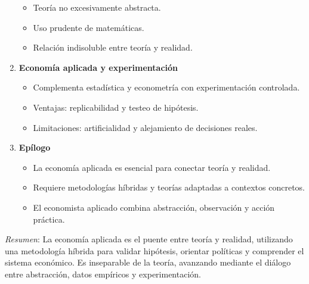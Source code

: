 \documentclass[12pt]{book} %
\providecommand{\tightlist}{%
  \setlength{\itemsep}{0pt}\setlength{\parskip}{0pt}}
\begin{document}
\begin{enumerate}
  \begin{itemize}
  \tightlist
  \item
    Teoría no excesivamente abstracta.
  \item
    Uso prudente de matemáticas.
  \item
    Relación indisoluble entre teoría y realidad.
  \end{itemize}
\item
  \textbf{Economía aplicada y experimentación}

  \begin{itemize}
  \tightlist
  \item
    Complementa estadística y econometría con experimentación
    controlada.
  \item
    Ventajas: replicabilidad y testeo de hipótesis.
  \item
    Limitaciones: artificialidad y alejamiento de decisiones reales.
  \end{itemize}
\item
  \textbf{Epílogo}

  \begin{itemize}
  \tightlist
  \item
    La economía aplicada es esencial para conectar teoría y realidad.
  \item
    Requiere metodologías híbridas y teorías adaptadas a contextos
    concretos.
  \item
    El economista aplicado combina abstracción, observación y acción
    práctica.
  \end{itemize}
\end{enumerate}

\emph{Resumen}: La economía aplicada es el puente entre teoría y
realidad, utilizando una metodología híbrida para validar hipótesis,
orientar políticas y comprender el sistema económico. Es inseparable de
la teoría, avanzando mediante el diálogo entre abstracción, datos
empíricos y experimentación.


\end{document}
